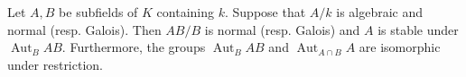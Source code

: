 Let $A, B$ be subfields of $K$ containing $k$. Suppose that $A/k$ is algebraic and normal (resp. Galois). Then $AB/B$ is normal (resp. Galois) and $A$ is stable under $\operatorname{Aut}_B AB$. Furthermore, the groups $\operatorname{Aut}_B AB$ and $\operatorname{Aut}_{A \cap B} A$ are isomorphic under restriction.
